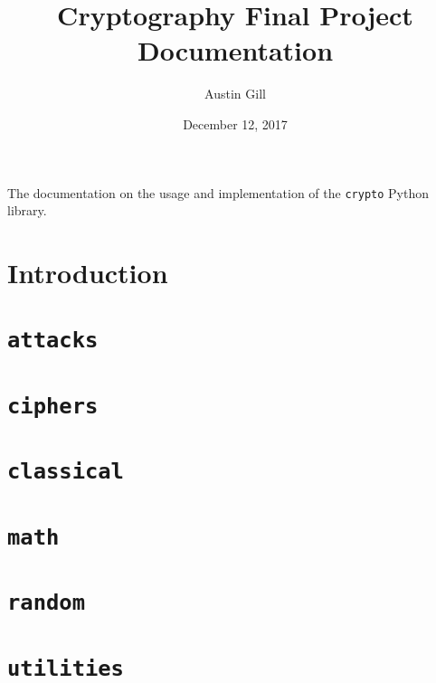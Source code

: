 \documentclass{article}
\author{Austin Gill}
\title{Cryptography Final Project Documentation}
\date{December 12, 2017}
\begin{document}
\maketitle

The documentation on the usage and implementation of the \texttt{crypto} Python library.

\tableofcontents

\section{Introduction}
    

\section{\texttt{attacks}}
    

\section{\texttt{ciphers}}
    

\section{\texttt{classical}}
    

\section{\texttt{math}}
    

\section{\texttt{random}}
    

\section{\texttt{utilities}}
    
\end{document}
